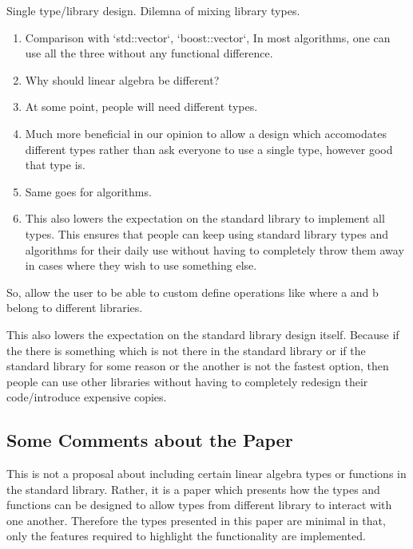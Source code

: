 \documentclass[oneside,11pt,a4paper]{jbarticle}
\begin{document}
Single type/library design. Dilemna of mixing library types.
\begin{enumerate}
  \item Comparison with `std::vector`, `boost::vector`,
    In most algorithms, one can use all the three without any functional
    difference.

  \item Why should linear algebra be different?

  \item At some point, people will need different types.

  \item Much more beneficial in our opinion to allow a design which accomodates
    different types rather than ask everyone to use a single type, however good
    that type is.

  \item Same goes for algorithms.

  \item This also lowers the expectation on the standard library to implement
    all types. This ensures that people can keep using standard library types
    and algorithms for their daily use without having to completely throw them
    away in cases where they wish to use something else.
\end{enumerate}

So, allow the user to be able to custom define operations like 
where a and b belong to different libraries.

This also lowers the expectation on the standard library design itself. Because
if the there is something which is not there in the standard library or if the
standard library for some reason or the another is not the fastest option, then
people can use other libraries without having to completely redesign their
code/introduce expensive copies.

\subsection{Some Comments about the Paper}
This is not a proposal about including certain linear algebra types or functions
in the standard library. Rather, it is a paper which presents how the types and
functions can be designed to allow types from different library to interact
with one another. Therefore the types presented in this paper are minimal in
that, only the features required to highlight the functionality are implemented.
\end{document}
